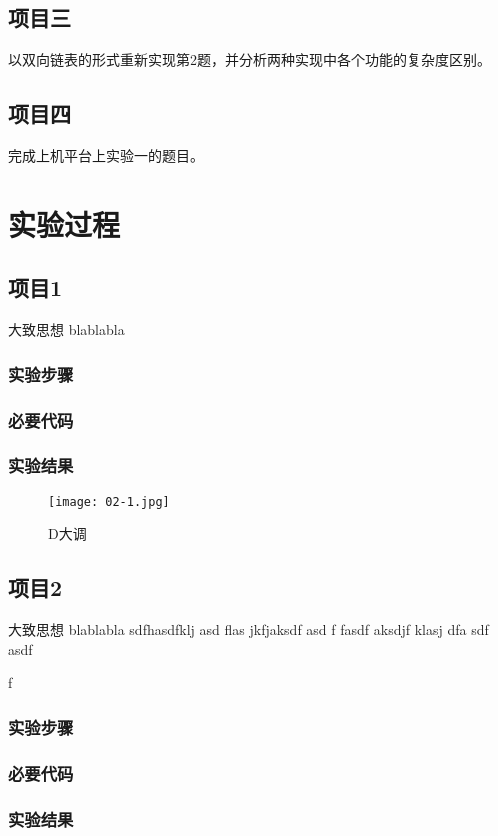 \subsection{项目三}
以双向链表的形式重新实现第2题，并分析两种实现中各个功能的复杂度区别。

\subsection{项目四}
完成上机平台上实验一的题目。

\section{实验过程}
\subsection{项目1}
大致思想 blablabla
\subsubsection{实验步骤}
\subsubsection{必要代码}

\subsubsection{实验结果}
	\begin{figure}[!bthp]
	\centering
        \texttt{[image: 02-1.jpg]}
        \caption{D大调}
      \end{figure}

\subsection{项目2}
大致思想 blablabla sdfhasdfklj asd flas jkfjaksdf asd f
fasdf aksdjf klasj dfa
sdf
asdf

f
\subsubsection{实验步骤}
\subsubsection{必要代码}
\subsubsection{实验结果}


